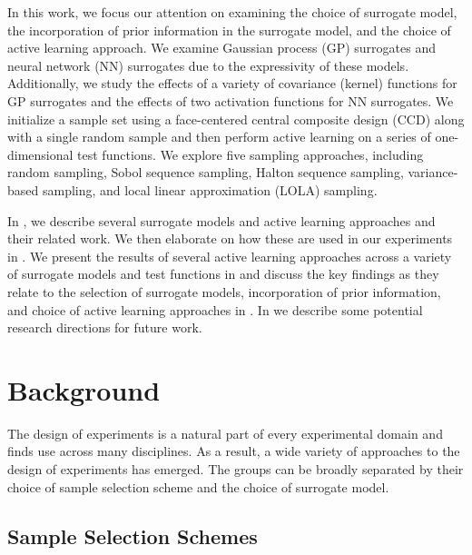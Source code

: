 \documentclass[conference,final]{IEEEtran}
\begin{document}
	In this work, we focus our attention on examining the choice of surrogate model, the incorporation of prior information in the surrogate model, and the choice of active learning approach. We examine Gaussian process (GP) surrogates and neural network (NN) surrogates due to the expressivity of these models. Additionally, we study the effects of a variety of covariance (kernel) functions for GP surrogates and the effects of two activation functions for NN surrogates. We initialize a sample set using a face-centered central composite design (CCD) along with a single random sample and then perform active learning on a series of one-dimensional test functions. We explore five sampling approaches, including random sampling, Sobol sequence sampling, Halton sequence sampling, variance-based sampling, and local linear approximation (LOLA) sampling.
	
    In , we describe several surrogate models and active learning approaches and their related work. We then elaborate on how these are used in our experiments in . We present the results of several active learning approaches across a variety of surrogate models and test functions in  and discuss the key findings as they relate to the selection of surrogate models, incorporation of prior information, and choice of active learning approaches in . In  we describe some potential research directions for future work.
	
	\section{Background}
	\label{sec:background}
	
	The design of experiments is a natural part of every experimental domain and finds use across many disciplines. As a result, a wide variety of approaches to the design of experiments has emerged. The groups can be broadly separated by their choice of sample selection scheme and the choice of surrogate model.
	
	\subsection{Sample Selection Schemes}
	
\end{document}
